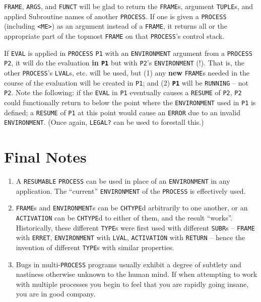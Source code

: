 \documentclass[a4paper]{scrbook}
\providecommand{\tightlist}{%
  \setlength{\itemsep}{0pt}\setlength{\parskip}{0pt}}
\begin{document}
\texttt{FRAME}, \texttt{ARGS}, and \texttt{FUNCT} will be glad to return the
\texttt{FRAME}s, argument \texttt{TUPLE}s, and applied Subroutine names of another \texttt{PROCESS}. If one is given a
\texttt{PROCESS} (including \texttt{\textless{}ME\textgreater{}}) as an argument instead of a \texttt{FRAME}, it returns
all or the appropriate part of the topmost \texttt{FRAME} on that \texttt{PROCESS}'s control stack.

If \texttt{EVAL} is applied in \texttt{PROCESS} \texttt{P1} with an \texttt{ENVIRONMENT} argument from a \texttt{PROCESS}
\texttt{P2}, it will do the evaluation \textbf{in \texttt{P1}} but with \texttt{P2}'s \texttt{ENVIRONMENT} (!). That is,
the other \texttt{PROCESS}'s \texttt{LVAL}s, etc. will be used, but (1) any \textbf{new} \texttt{FRAME}s needed in the
course of the evaluation will be created in \texttt{P1}; and (2) \textbf{\texttt{P1}} will be \texttt{RUNNING} -- not
\texttt{P2}. Note the following: if the \texttt{EVAL} in \texttt{P1} eventually causes a \texttt{RESUME} of \texttt{P2},
\texttt{P2} could functionally return to below the point where the \texttt{ENVIRONMENT} used in \texttt{P1} is defined; a
\texttt{RESUME} of \texttt{P1} at this point would cause an \texttt{ERROR} due to an invalid \texttt{ENVIRONMENT}. (Once
again, \texttt{LEGAL?} can be used to forestall this.)

\section{Final Notes}\label{final-notes}

\begin{enumerate}
\def\labelenumi{\arabic{enumi}.}
\tightlist
\item
  A \texttt{RESUMABLE} \texttt{PROCESS} can be used in place of an \texttt{ENVIRONMENT} in any application. The ``current''
  \texttt{ENVIRONMENT} of the \texttt{PROCESS} is effectively used.
\item
  \texttt{FRAME}s and \texttt{ENVIRONMENT}s can be \texttt{CHTYPE}d arbitrarily to one another, or an \texttt{ACTIVATION}
  can be \texttt{CHTYPE}d to either of them, and the result ``works''. Historically, these different \texttt{TYPE}s were
  first used with different \texttt{SUBR}s -- \texttt{FRAME} with \texttt{ERRET}, \texttt{ENVIRONMENT} with \texttt{LVAL},
  \texttt{ACTIVATION} with \texttt{RETURN} -- hence the invention of different \texttt{TYPE}s with similar properties.
\item
  Bugs in multi-\texttt{PROCESS} programs usually exhibit a degree of subtlety and nastiness otherwise unknown to the human
  mind. If when attempting to work with multiple processes you begin to feel that you are rapidly going insane, you are in
  good company.
\end{enumerate}
\end{document}
